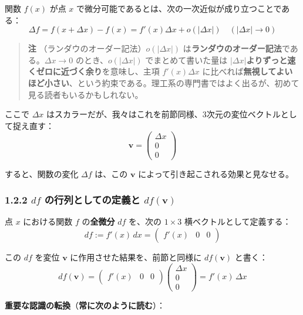 \documentclass[a4paper,12pt,openany]{book}
\begin{document}
関数 \(f(x)\) が点 \(x\)
で微分可能であるとは、次の一次近似が成り立つことである：
\[\Delta f = f(x + \Delta x) - f(x) = f'(x) \Delta x + o(|\Delta x|) \quad (|\Delta x| \to 0)\]

\begin{quote}
\textbf{注} （ランダウのオーダー記法）\(o(|\Delta x|)\)
は\textbf{ランダウのオーダー記法}である。\(\Delta x \to 0\)
のとき、\(o(|\Delta x|)\) でまとめて書いた量は
\(|\Delta x|\)\textbf{よりずっと速くゼロに近づく余り}を意味し、主項
\(f'(x)\Delta x\)
に比べれば\textbf{無視してよいほど小さい}、という約束である。理工系の専門書ではよく出るが、初めて見る読者もいるかもしれない。
\end{quote}

ここで \(\Delta x\)
はスカラーだが、我々はこれを前節同様、3次元の変位ベクトルとして捉え直す：
\[\mathbf{v} = \begin{pmatrix} \Delta x \\ 0 \\ 0 \end{pmatrix}\]

すると、関数の変化 \(\Delta f\) は、この \(\mathbf{v}\)
によって引き起こされる効果と見なせる。

\hypertarget{df-ux306eux884cux5217ux3068ux3057ux3066ux306eux5b9aux7fa9ux3068-dfmathbfv}{%
\subsubsection{\texorpdfstring{1.2.2 \(df\) の行列としての定義と
\(df(\mathbf{v})\)}{1.2.2 df の行列としての定義と df(\textbackslash mathbf\{v\})}}\label{df-ux306eux884cux5217ux3068ux3057ux3066ux306eux5b9aux7fa9ux3068-dfmathbfv}}

点 \(x\) における関数 \(f\) の\textbf{全微分} \(df\) を、次の
\(1 \times 3\) 横ベクトルとして定義する：
\[df := f'(x) \, dx = \begin{pmatrix} f'(x) & 0 & 0 \end{pmatrix}\]

この \(df\) を変位 \(\mathbf{v}\) に作用させた結果を、前節と同様に
\(df(\mathbf{v})\) と書く：
\[df(\mathbf{v}) = \begin{pmatrix} f'(x) & 0 & 0 \end{pmatrix} \begin{pmatrix} \Delta x \\ 0 \\ 0 \end{pmatrix} = f'(x)\,\Delta x\]

\textbf{重要な認識の転換}（\textbf{常に次のように読む}）：
\end{document}
